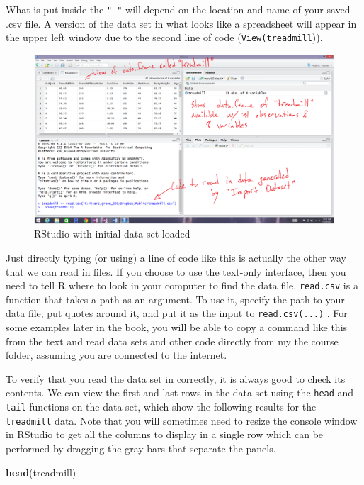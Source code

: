\documentclass[]{article}
\newenvironment{Shaded}{\begin{snugshade}}{\end{snugshade}}
\newcommand{\KeywordTok}[1]{\textcolor[rgb]{0.13,0.29,0.53}{\textbf{{#1}}}}
\newcommand{\NormalTok}[1]{{#1}}
\begin{document}
What is put inside the \texttt{"\ "} will depend on the location and
name of your saved .csv file. A version of the data set in what looks
like a spreadsheet will appear in the upper left window due to the
second line of code (\texttt{View(treadmill})).



\begin{figure}
\includegraphics[width=14.72in]{chapter0_files/image005} \caption{RStudio with initial data set loaded}\label{fig:Figure3}
\end{figure}

Just directly typing (or using) a line of code like this is actually the
other way that we can read in files. If you choose to use the text-only
interface, then you need to tell R where to look in your computer to
find the data file. \texttt{read.csv} is a function that takes a path as
an argument. To use it, specify the path to your data file, put quotes
around it, and put it as the input to \texttt{read.csv(...)} . For some
examples later in the book, you will be able to copy a command like this
from the text and read data sets and other code directly from my the
course folder, assuming you are connected to the internet.

To verify that you read the data set in correctly, it is always good to
check its contents. We can view the first and last rows in the data set
using the \texttt{head} and \texttt{tail} functions on the data set,
which show the following results for the \texttt{treadmill} data. Note
that you will sometimes need to resize the console window in RStudio to
get all the columns to display in a single row which can be performed by
dragging the gray bars that separate the panels.

\begin{Shaded}
\begin{Highlighting}[]
\KeywordTok{head}\NormalTok{(treadmill)}
\end{Highlighting}
\end{Shaded}
\end{document}
